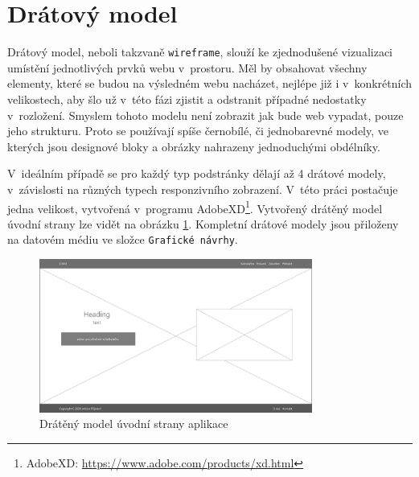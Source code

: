 \section{Drátový model}
\label{section:wireframe}
Drátový model, neboli takzvaně \texttt{wireframe}, slouží ke zjednodušené vizualizaci umístění jednotlivých prvků webu v~prostoru. Měl by obsahovat všechny elementy, které se budou na výsledném webu nacházet, nejlépe již i v~konkrétních velikostech, aby šlo už v~této fázi zjistit a odstranit případné nedostatky v~rozložení. Smyslem tohoto modelu není zobrazit jak bude web vypadat, pouze jeho strukturu. Proto se používají spíše černobílé, či jednobarevné modely, ve kterých jsou designové bloky a obrázky nahrazeny jednoduchými obdélníky.
\par V~ideálním případě se pro každý typ podstránky dělají až 4 drátové modely, v~závislosti na různých typech responzivního zobrazení. V~této práci postačuje jedna velikost, vytvořená v~programu AdobeXD\footnote{AdobeXD: \url{https://www.adobe.com/products/xd.html}}. Vytvořený drátěný model úvodní strany lze vidět na obrázku \ref{fig:wireframe-homepage}. Kompletní drátové modely jsou přiloženy na datovém médiu ve složce \texttt{Grafické návrhy}. 

\begin{figure}
    \centering
    \includegraphics[width=0.8\textwidth]{obrazky-figures/wireframe-homepage.pdf}
    \caption{Drátěný model úvodní strany aplikace}
    \label{fig:wireframe-homepage}
\end{figure}



